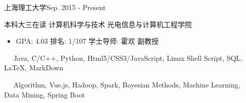 \documentclass{sorahjy_cv}
\begin{document}
\pagestyle{empty}


\begin{cvHeader}
\end{cvHeader}

%
%

\begin{sectionContentSimple}{上海理工大学}{Sep. 2015 - Present}
	\item 本科大三在读 \quad 计算机科学与技术 \quad 光电信息与计算机工程学院
	\begin{itemize}
		\item GPA: 4.03 \quad 排名: 1/107 \quad 学士导师: 霍欢 副教授
	\end{itemize}
	
\end{sectionContentSimple}

%
%






%
%

\begin{description}{}
	\item{\ \ } Java, C/C++, Python, Html5/CSS3/JavaScript, Linux Shell Script, SQL, \LaTeX, MarkDown
	\item{\ \ } Algorithm, Vue.js, Hadoop, Spark, Bayesian Methods, Machine Learning, Data Mining, Spring Boot
\end{description}
\end{document}
